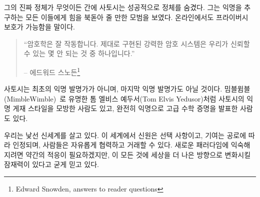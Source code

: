 \begin{comment}
	Whatever his real identity might be, Satoshi was successful in hiding
	it. He set an encouraging example for everyone who wishes to remain
	anonymous: it is possible to have privacy online.
\end{comment}
그의 진짜 정체가 무엇이든 간에 사토시는 성공적으로 정체를 숨겼다.
그는 익명을 추구하는 모든 이들에게 힘을 북돋아 줄 만한 모범을 보였다.
온라인에서도 프라이버시 보호가 가능함을 말이다.

\begin{quotation}\begin{samepage}
		\enquote{암호학은 잘 작동합니다. 제대로 구현된 강력한 암호 시스템은 우리가 신뢰할 수 있는 몇 안 되는 것 중 하나입니다.}
		\begin{flushright} -- 에드워드 스노든\footnote{Edward Snowden, answers to reader questions\cite{snowden}}
\end{flushright}\end{samepage}\end{quotation}

\begin{comment}
	Satoshi wasn't the first pseudonymous or anonymous inventor, and he won't be the
	last. Some have directly imitated this pseudonymous publication style, like Tom
	Elvis Yedusor of MimbleWimble~\cite{mimblewimble-origin} fame, while others have
	published advanced mathematical proofs while remaining completely
	anonymous~\cite{4chan-math}.
\end{comment}
사토시는 최초의 익명 발명가가 아니며, 마지막 익명 발명가도 아닐 것이다.
밈블윔블(MimbleWimble)~\cite{mimblewimble-origin}로 유명한 톰 엘비스 예두서(Tom Elvis Yedusor)처럼 사토시의 익명 게재 스타일을 모방한 사람도 있고,
완전히 익명으로 고급 수학 증명을 발표한 사람도 있다.~\cite{4chan-math}


\begin{comment}
	It is a strange new world we are living in. A world where identity is
	optional, contributions are accepted based on merit, and people can
	collaborate and transact freely. It will take some adjustment to get
	comfortable with these new paradigms, but I strongly believe that all of
	this has the potential to change the world for the better.
\end{comment}
우리는 낯선 신세계를 살고 있다. 
이 세계에서 신원은 선택 사항이고, 기여는 공로에 따라 인정되며, 사람들은 자유롭게 협력하고 거래할 수 있다.
새로운 패러다임에 익숙해지려면 약간의 적응이 필요하겠지만, 이 모든 것에 세상을 더 나은 방향으로 변화시킬 잠재력이 있다고 굳게 믿고 있다.


